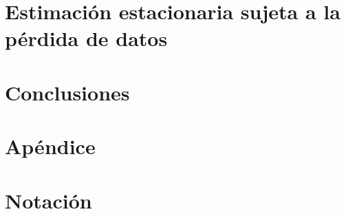\documentclass[10pt,letterpaper]{phstylee} %
\begin{document}
\chapter{Estimaci\'on estacionaria sujeta a la p\'erdida de datos}
\label{cap:estimacion_mimo}

%
%
\cleardoublepage
\chapter{Conclusiones}
\label{cap:conclusiones}

%
%
%

\cleardoublepage
\appendix
\chapter{Ap\'endice}
\label{cap:apendice}

\chapter{Notaci\'on}
\label{cap:notacion}






\end{document}
